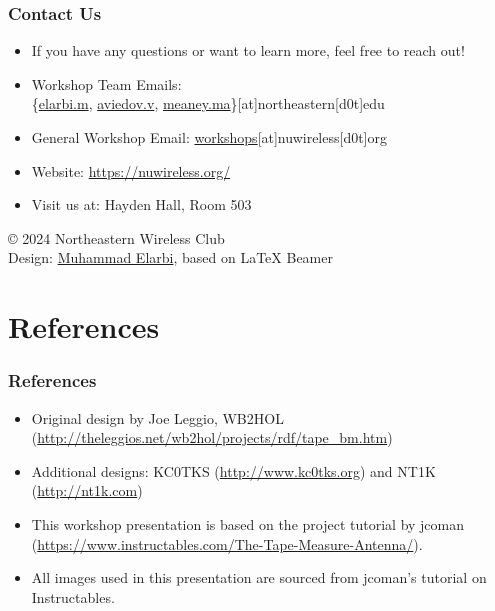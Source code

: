 \documentclass{beamer}
\begin{document}
\begin{frame}
    \frametitle{Contact Us}
    \begin{itemize}
        \item If you have any questions or want to learn more, feel free to reach out!
        \item Workshop Team Emails: \\
        \{\href{mailto:elarbi.m@northeastern.edu}{elarbi.m}, 
        \href{mailto:aviedov.v@northeastern.edu}{aviedov.v}, 
        \href{mailto:meaney.ma@northeastern.edu}{meaney.ma}\}[at]northeastern[d0t]edu
        \item General Workshop Email: \href{mailto:workshops@nuwireless.org}{workshops}[at]nuwireless[d0t]org
        \item Website: \url{https://nuwireless.org/}
        \item Visit us at: Hayden Hall, Room 503
    \end{itemize}
    \vspace{1cm}
    \begin{flushright}
        \footnotesize{© 2024 Northeastern Wireless Club} \\
        \footnotesize{Design: \href{https://melarbi.com}{Muhammad Elarbi}, based on LaTeX Beamer}
    \end{flushright}
\end{frame}

\section{References} 
\begin{frame} 
    \frametitle{References} 
    \begin{itemize} 
        \item Original design by Joe Leggio, WB2HOL (\url{http://theleggios.net/wb2hol/projects/rdf/tape_bm.htm}) 
        \item Additional designs: KC0TKS (\url{http://www.kc0tks.org}) and NT1K (\url{http://nt1k.com}) 
        \item This workshop presentation is based on the project tutorial by jcoman (\url{https://www.instructables.com/The-Tape-Measure-Antenna/}).
        \item All images used in this presentation are sourced from jcoman's tutorial on Instructables.
    \end{itemize}
\end{frame}
\end{document}
